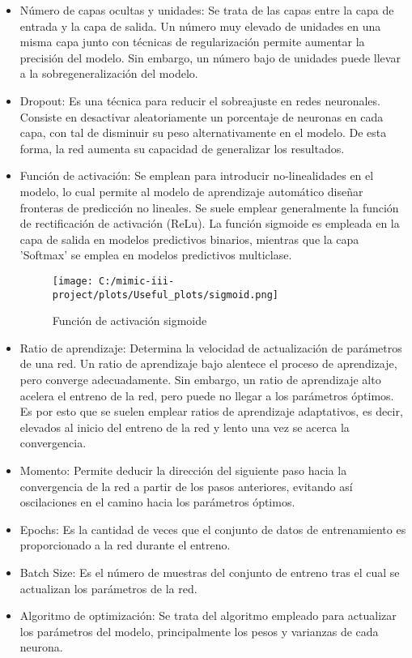 \documentclass{report}
\begin{document}
\begin{itemize}
\item
  Número de capas ocultas y unidades: Se trata de las capas entre la
  capa de entrada y la capa de salida. Un número muy elevado de unidades
  en una misma capa junto con técnicas de regularización permite
  aumentar la precisión del modelo. Sin embargo, un número bajo de
  unidades puede llevar a la sobregeneralización del modelo.
\item
  Dropout: Es una técnica para reducir el sobreajuste en redes
  neuronales. Consiste en desactivar aleatoriamente un porcentaje de
  neuronas en cada capa, con tal de disminuir su peso alternativamente
  en el modelo. De esta forma, la red aumenta su capacidad de
  generalizar los resultados.

\item
  Función de activación: Se emplean para introducir no-linealidades en
  el modelo, lo cual permite al modelo de aprendizaje automático diseñar
  fronteras de predicción no lineales. Se suele emplear generalmente la
  función de rectificación de activación (ReLu). La función sigmoide es
  empleada en la capa de salida en modelos predictivos binarios,
  mientras que la capa 'Softmax' se emplea en modelos predictivos
  multiclase. 

\begin{figure}[H]
\centering
\texttt{[image: C:/mimic-iii-project/plots/Useful\_plots/sigmoid.png]}
\caption{Función de activación sigmoide}
\end{figure}

\item
  Ratio de aprendizaje: Determina la velocidad de actualización de
  parámetros de una red. Un ratio de aprendizaje bajo alentece el
  proceso de aprendizaje, pero converge adecuadamente. Sin embargo, un
  ratio de aprendizaje alto acelera el entreno de la red, pero puede no
  llegar a los parámetros óptimos. Es por esto que se suelen emplear
  ratios de aprendizaje adaptativos, es decir, elevados al inicio del
  entreno de la red y lento una vez se acerca la convergencia. 
\item
  Momento: Permite deducir la dirección del siguiente paso hacia la
  convergencia de la red a partir de los pasos anteriores, evitando así
  oscilaciones en el camino hacia los parámetros óptimos. 
\item
  Epochs: Es la cantidad de veces que el conjunto de datos de
  entrenamiento es proporcionado a la red durante el entreno. 
\item
  Batch Size: Es el número de muestras del conjunto de entreno tras el
  cual se actualizan los parámetros de la red. 
\item
  Algoritmo de optimización: Se trata del algoritmo empleado para
  actualizar los parámetros del modelo, principalmente los pesos y
  varianzas de cada neurona. 
\end{itemize}
\end{document}
